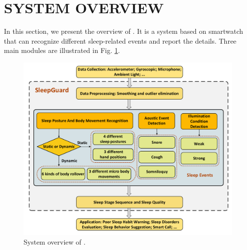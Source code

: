 {\section{SYSTEM OVERVIEW}} In this section, we present the overview of {\systemname}. It is a system based on smartwatch that can
recognize different sleep-related events and report the details. Three main modules are illustrated in Fig. \ref{fig:overview}.

\begin{figure}[!thbp]
\centering
      \includegraphics[width=0.97\linewidth]{Figures/SystemFlow.pdf}
  \caption{System overview of {\systemname}.}\label{fig:overview}
\end{figure}


